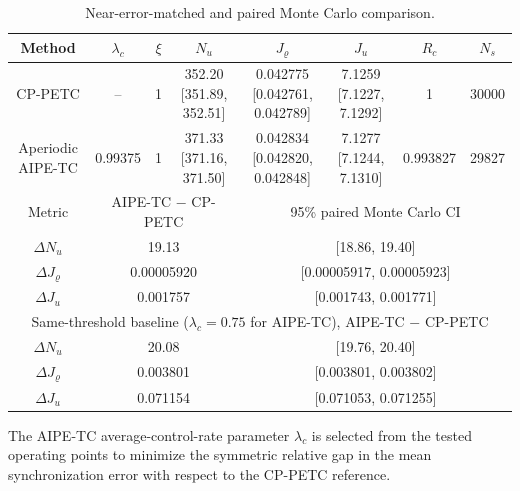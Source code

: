 \begin{table}[H]
\centering
\setlength{\tabcolsep}{3pt}
\caption{Near-error-matched and paired Monte Carlo comparison.}\label{tab:performance_matched}
\scriptsize
\begin{tabular}{cccccccc}
\toprule
Method & $\lambda_c$ & $\xi$ & $N_u$ & $J_\varrho$ & $J_u$ & $R_c$ & $N_s$ \\
\midrule
CP-PETC & -- & 1 & 352.20 [351.89, 352.51] & 0.042775 [0.042761, 0.042789] & 7.1259 [7.1227, 7.1292] & 1 & 30000 \\
Aperiodic AIPE-TC & 0.99375 & 1 & 371.33 [371.16, 371.50] & 0.042834 [0.042820, 0.042848] & 7.1277 [7.1244, 7.1310] & 0.993827 & 29827 \\
\midrule
Metric & \multicolumn{3}{c}{AIPE-TC $-$ CP-PETC} & \multicolumn{4}{c}{95\% paired Monte Carlo CI} \\
$\Delta N_u$ & \multicolumn{3}{c}{19.13} & \multicolumn{4}{c}{[18.86, 19.40]} \\
$\Delta J_\varrho$ & \multicolumn{3}{c}{0.00005920} & \multicolumn{4}{c}{[0.00005917, 0.00005923]} \\
$\Delta J_u$ & \multicolumn{3}{c}{0.001757} & \multicolumn{4}{c}{[0.001743, 0.001771]} \\
\midrule
\multicolumn{8}{c}{Same-threshold baseline ($\lambda_c=0.75$ for AIPE-TC), AIPE-TC $-$ CP-PETC}\\
$\Delta N_u$ & \multicolumn{3}{c}{20.08} & \multicolumn{4}{c}{[19.76, 20.40]} \\
$\Delta J_\varrho$ & \multicolumn{3}{c}{0.003801} & \multicolumn{4}{c}{[0.003801, 0.003802]} \\
$\Delta J_u$ & \multicolumn{3}{c}{0.071154} & \multicolumn{4}{c}{[0.071053, 0.071255]} \\
\bottomrule
\end{tabular}
\par\smallskip The AIPE-TC average-control-rate parameter $\lambda_c$ is selected from the tested operating points to minimize the symmetric relative gap in the mean synchronization error with respect to the CP-PETC reference.
\end{table}
